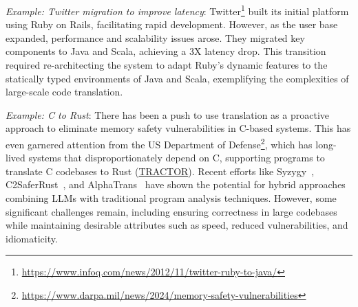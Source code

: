 


\begin{tcolorbox}[colback=lightblue, boxrule=0pt, arc=5pt, outer arc=5pt]
\textit{Example: Twitter migration to improve latency}: Twitter\footnote{\url{https://www.infoq.com/news/2012/11/twitter-ruby-to-java/}} built its initial platform using Ruby on Rails, facilitating rapid development. However, as the user base expanded, performance and scalability issues arose. They migrated key components to Java and Scala, achieving a 3X latency drop. This transition required re-architecting the system to adapt Ruby's dynamic features to the statically typed environments of Java and Scala, exemplifying the complexities of large-scale code translation.
\end{tcolorbox}

\begin{tcolorbox}[colback=lightblue, boxrule=0pt, arc=5pt, outer arc=5pt]
\textit{Example: C to Rust}: There has been a push to use translation as a proactive approach to eliminate memory safety vulnerabilities in C-based systems. This has even garnered attention from the US Department of Defense\footnote{\url{https://www.darpa.mil/news/2024/memory-safety-vulnerabilities}}, which has long-lived systems that disproportionately depend on C, supporting programs to translate C codebases to Rust (\href{https://www.darpa.mil/research/programs/translating-all-c-to-rust}{TRACTOR}). 
% 
Recent efforts like Syzygy~\citep{shetty2024syzygy}, C2SaferRust~\citep{nitin2025c2saferrust}, and AlphaTrans~\citep{alphatrans} have shown the potential for hybrid approaches combining LLMs with traditional program analysis techniques. 
However, some significant challenges remain, including ensuring correctness in large codebases while maintaining desirable attributes such as speed, reduced vulnerabilities, and idiomaticity.
\end{tcolorbox}


